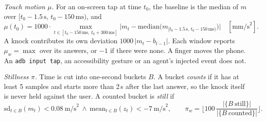 \documentclass[10pt]{article}
\newcommand{\code}[1]{\texttt{\small #1}}
\begin{document}
\emph{Touch motion $\mu$.} For an on-screen tap at time $t_0$, the baseline is the median of $m$ over
$[t_0-1.5\,\text{s},\,t_0-150\,\text{ms})$, and
\begin{equation}\label{eq:mu}
\mu(t_0)=1000\cdot\max_{t\in[t_0-150\,\text{ms},\ t_0+300\,\text{ms}]}\big|m_t-\mathrm{median}\big(m_{[t_0-1.5\,\text{s},\,t_0-150\,\text{ms})}\big)\big|
\quad[\text{mm/s}^2].
\end{equation}
A knock contributes its own deviation $1000\,|m_t-b_{t-1}|$. Each window reports $\mu_w=\max$ over its answers, or $-1$
if there were none. A finger moves the phone. An \code{adb input tap}, an accessibility gesture or an agent's injected
event does not.

\emph{Stillness $\pi$.} Time is cut into one-second buckets $B$. A bucket \emph{counts} if it has at least 5 samples and
starts more than 2\,s after the last answer, so the knock itself is never held against the user. A counted bucket is
\emph{still} if
\begin{equation}
\mathrm{sd}_{t\in B}(m_t) < 0.08\ \text{m/s}^2\ \wedge\ \mathrm{mean}_{t\in B}(z_t)<-7\ \text{m/s}^2,\qquad
\pi_w=\Big\lfloor 100\,\frac{|\{B\ \text{still}\}|}{|\{B\ \text{counted}\}|}\Big\rfloor .
\end{equation}
\end{document}
